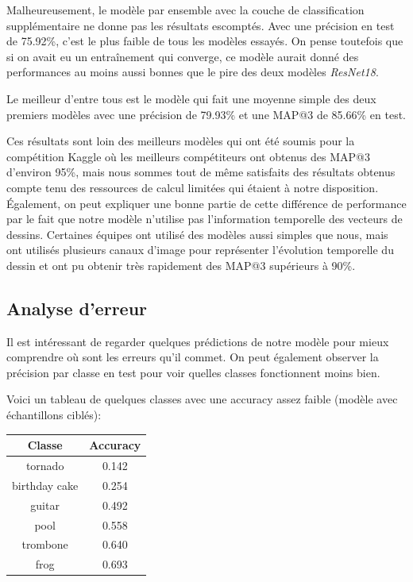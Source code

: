 Malheureusement, le modèle par ensemble avec la couche de classification supplémentaire ne donne pas les résultats escomptés.
Avec une précision en test de 75.92\%, c'est le plus faible de tous les modèles essayés. On pense toutefois que si on avait eu un entraînement qui converge, ce modèle aurait donné des performances au moins aussi bonnes que le pire des deux modèles \emph{ResNet18}.


Le meilleur d'entre tous est le modèle qui fait une moyenne simple des deux premiers modèles avec une précision de 79.93\% et une MAP@3 de 85.66\% en test.

Ces résultats sont loin des meilleurs modèles qui ont été soumis pour la compétition Kaggle où les meilleurs compétiteurs ont obtenus des MAP@3 d'environ 95\%, mais nous sommes tout de même satisfaits des résultats obtenus compte tenu des ressources de calcul limitées qui étaient à notre disposition.
Également, on peut expliquer une bonne partie de cette différence de performance par le fait que notre modèle n'utilise pas l'information temporelle des vecteurs de dessins. 
Certaines équipes ont utilisé des modèles aussi simples que nous, mais ont utilisés plusieurs canaux d'image pour représenter l'évolution temporelle du dessin et ont pu obtenir très rapidement des MAP@3 supérieurs à 90\%.


\subsection{Analyse d'erreur}
Il est intéressant de regarder quelques prédictions de notre modèle pour mieux comprendre où sont les erreurs qu'il commet. 
On peut également observer la précision par classe en test pour voir quelles classes fonctionnent moins bien.


Voici un tableau de quelques classes avec une accuracy assez faible (modèle avec échantillons ciblés):
\begin{center}
\begin{tabular}{|c|c|}
\hline
\textbf{Classe} & \textbf{Accuracy} \\ \hline
tornado & 0.142 \\ \hline
birthday cake & 0.254 \\ \hline
guitar & 0.492 \\ \hline
pool & 0.558 \\ \hline
trombone & 0.640 \\ \hline
frog & 0.693 \\ \hline
\end{tabular}
\end{center}



